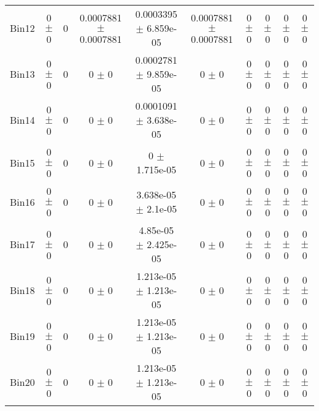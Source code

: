 \begin{tabular}{@{\extracolsep{4pt}}lccccccccc@{}}
     Bin12 & 0 $\pm$ 0 & 0 & 0.0007881 $\pm$ 0.0007881 & 0.0003395 $\pm$ 6.859e-05 & 0.0007881 $\pm$ 0.0007881 & 0 $\pm$ 0 & 0 $\pm$ 0 & 0 $\pm$ 0 & 0 $\pm$ 0 \\ 
     Bin13 & 0 $\pm$ 0 & 0 & 0 $\pm$ 0 & 0.0002781 $\pm$ 9.859e-05 & 0 $\pm$ 0 & 0 $\pm$ 0 & 0 $\pm$ 0 & 0 $\pm$ 0 & 0 $\pm$ 0 \\ 
     Bin14 & 0 $\pm$ 0 & 0 & 0 $\pm$ 0 & 0.0001091 $\pm$ 3.638e-05 & 0 $\pm$ 0 & 0 $\pm$ 0 & 0 $\pm$ 0 & 0 $\pm$ 0 & 0 $\pm$ 0 \\ 
     Bin15 & 0 $\pm$ 0 & 0 & 0 $\pm$ 0 & 0 $\pm$ 1.715e-05 & 0 $\pm$ 0 & 0 $\pm$ 0 & 0 $\pm$ 0 & 0 $\pm$ 0 & 0 $\pm$ 0 \\ 
     Bin16 & 0 $\pm$ 0 & 0 & 0 $\pm$ 0 & 3.638e-05 $\pm$ 2.1e-05 & 0 $\pm$ 0 & 0 $\pm$ 0 & 0 $\pm$ 0 & 0 $\pm$ 0 & 0 $\pm$ 0 \\ 
     Bin17 & 0 $\pm$ 0 & 0 & 0 $\pm$ 0 & 4.85e-05 $\pm$ 2.425e-05 & 0 $\pm$ 0 & 0 $\pm$ 0 & 0 $\pm$ 0 & 0 $\pm$ 0 & 0 $\pm$ 0 \\ 
     Bin18 & 0 $\pm$ 0 & 0 & 0 $\pm$ 0 & 1.213e-05 $\pm$ 1.213e-05 & 0 $\pm$ 0 & 0 $\pm$ 0 & 0 $\pm$ 0 & 0 $\pm$ 0 & 0 $\pm$ 0 \\ 
     Bin19 & 0 $\pm$ 0 & 0 & 0 $\pm$ 0 & 1.213e-05 $\pm$ 1.213e-05 & 0 $\pm$ 0 & 0 $\pm$ 0 & 0 $\pm$ 0 & 0 $\pm$ 0 & 0 $\pm$ 0 \\ 
     Bin20 & 0 $\pm$ 0 & 0 & 0 $\pm$ 0 & 1.213e-05 $\pm$ 1.213e-05 & 0 $\pm$ 0 & 0 $\pm$ 0 & 0 $\pm$ 0 & 0 $\pm$ 0 & 0 $\pm$ 0 \\ 
\hline\hline
  \end{tabular}
